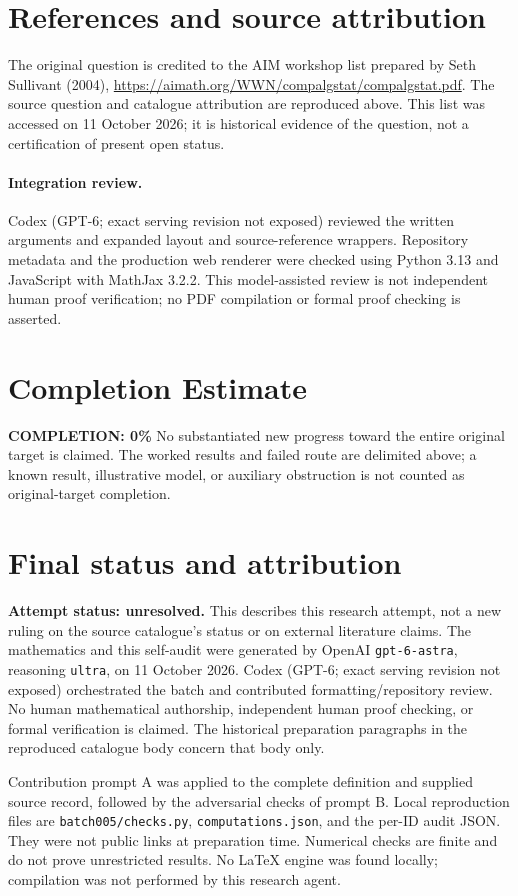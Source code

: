\documentclass[11pt]{article}
\begin{document}
\section{References and source attribution}
The original question is credited to the AIM workshop list prepared by Seth Sullivant (2004), \url{https://aimath.org/WWN/compalgstat/compalgstat.pdf}. The source question and catalogue attribution are reproduced above. This list was accessed on 11 October 2026; it is historical evidence of the question, not a certification of present open status.


\paragraph{Integration review.} Codex (GPT-6; exact serving revision not exposed) reviewed the written arguments and expanded layout and source-reference wrappers. Repository metadata and the production web renderer were checked using Python 3.13 and JavaScript with MathJax 3.2.2. This model-assisted review is not independent human proof verification; no PDF compilation or formal proof checking is asserted.

\section{Completion Estimate}
\noindent\textbf{COMPLETION: 0\%}
No substantiated new progress toward the entire original target is claimed. The worked results and failed route are delimited above; a known result, illustrative model, or auxiliary obstruction is not counted as original-target completion.

\section{Final status and attribution}
\textbf{Attempt status: unresolved.} This describes this research attempt, not a new ruling on the source catalogue's status or on external literature claims.
The mathematics and this self-audit were generated by OpenAI \texttt{gpt-6-astra}, reasoning \texttt{ultra}, on 11 October 2026. Codex (GPT-6; exact serving revision not exposed) orchestrated the batch and contributed formatting/repository review. No human mathematical authorship, independent human proof checking, or formal verification is claimed. The historical preparation paragraphs in the reproduced catalogue body concern that body only.

Contribution prompt A was applied to the complete definition and supplied source record, followed by the adversarial checks of prompt B. Local reproduction files are \texttt{batch005/checks.py}, \texttt{computations.json}, and the per-ID audit JSON. They were not public links at preparation time. Numerical checks are finite and do not prove unrestricted results. No LaTeX engine was found locally; compilation was not performed by this research agent.
\end{document}
